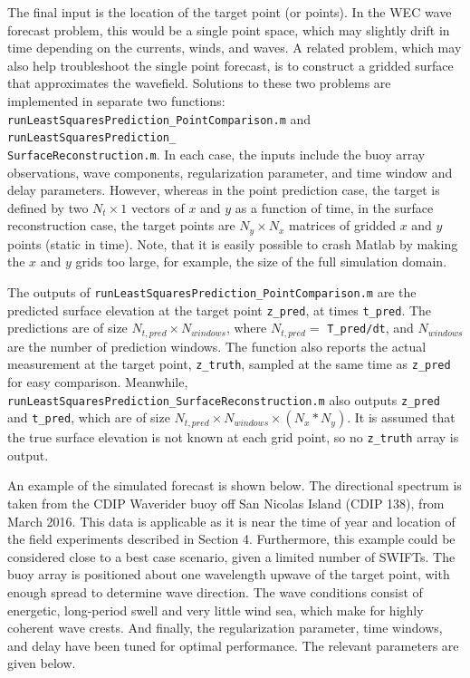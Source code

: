 \documentclass[11pt]{article}
\begin{document}
The final input is the location of the target point (or points).  In the WEC wave forecast problem, this would be a single point space, which may slightly drift in time depending on the currents, winds, and waves.  A related problem, which may also help troubleshoot the single point forecast, is to construct a gridded surface that approximates the wavefield.  Solutions to these two problems are implemented in separate two functions: \texttt{runLeastSquaresPrediction\_PointComparison.m} and \texttt{runLeastSquaresPrediction\_\\SurfaceReconstruction.m}.  In each case, the inputs include the buoy array observations, wave components, regularization parameter, and time window and delay parameters.  However, whereas in the point prediction case, the target is defined by two $N_t\times1$ vectors of $x$ and $y$ as a function of time, in the surface reconstruction case, the target points are $N_y \times N_x$ matrices of gridded $x$ and $y$ points (static in time).  Note, that it is easily possible to crash Matlab by making the $x$ and $y$ grids too large, for example, the size of the full simulation domain.

The outputs of \texttt{runLeastSquaresPrediction\_PointComparison.m} are the predicted surface elevation at the target point \texttt{z\_pred}, at times \texttt{t\_pred}.  The predictions are of size $N_{t,pred}\times N_{windows}$, where $N_{t,pred} = $ \texttt{T\_pred/dt}, and $N_{windows}$ are the number of prediction windows.  The function also reports the actual measurement at the target point, \texttt{z\_truth}, sampled at the same time as \texttt{z\_pred} for easy comparison.  Meanwhile, 
\texttt{runLeastSquaresPrediction\_SurfaceReconstruction.m} also outputs \texttt{z\_pred} and \texttt{t\_pred}, which are of size $N_{t,pred}\times N_{windows} \times (N_{x}*N_{y})$.  It is assumed that the true surface elevation is not known at each grid point, so no \texttt{z\_truth} array is output.

An example of the simulated forecast is shown below.  The directional spectrum is taken from the CDIP Waverider buoy off San Nicolas Island (CDIP 138), from March 2016.  This data is applicable as it is near the time of year and location of the field experiments described in Section 4.  Furthermore, this example could be considered close to a best case scenario, given a limited number of SWIFTs.  The buoy array is positioned about one wavelength upwave of the target point, with enough spread to determine wave direction.  The wave conditions consist of energetic, long-period swell and very little wind sea, which make for highly coherent wave crests.  And finally, the regularization parameter, time windows, and delay have been tuned for optimal performance.  The relevant parameters are given below.
\end{document}
